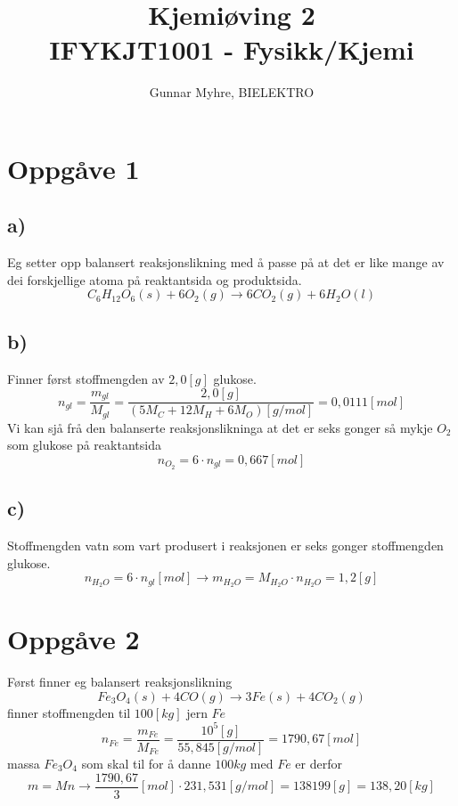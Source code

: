 \documentclass[12pt,a4paper]{article}
\title{%
  Kjemiøving 2 \\
  \large IFYKJT1001 - Fysikk/Kjemi \\
  }
\author{Gunnar Myhre, BIELEKTRO}
\begin{document}
  \maketitle

  \section*{Oppgåve 1}
    \subsection*{a)}
    Eg setter opp balansert reaksjonslikning med å passe på at det er like mange av
    dei forskjellige atoma på reaktantsida og produktsida.
    \begin{equation}
      C_6H_{12}O_6(s) + 6O_2(g) \longrightarrow 6CO_2(g) + 6H_2O(l)
    \end{equation}

    \subsection*{b)}
    Finner først stoffmengden av $2,0[g]$ glukose.
    \begin{equation}
      n_{gl} = \frac{m_{gl}}{M_{gl}} = \frac{2,0[g]}{(5M_C + 12M_H + 6M_O)[g/mol]} = 0,0111[mol]
    \end{equation}
    Vi kan sjå frå den balanserte reaksjonslikninga at det er seks gonger så mykje $O_2$ som
    glukose på reaktantsida
    \begin{equation}
      n_{O_2} = 6\cdot n_{gl} = 0,667[mol]
    \end{equation}

    \subsection*{c)}
    Stoffmengden vatn som vart produsert i reaksjonen er seks gonger stoffmengden glukose.
    \begin{equation}
      n_{H_2O} = 6\cdot n_{gl} [mol] \rightarrow m_{H_2O} = M_{H_2O}\cdot n_{H_2O} = 1,2[g]
    \end{equation}


  \section*{Oppgåve 2}
    Først finner eg balansert reaksjonslikning
    \begin{equation}
      Fe_3O_4(s) + 4CO(g) \longrightarrow 3Fe(s) + 4CO_2(g)
    \end{equation}
    finner stoffmengden til $100[kg]$ jern $Fe$
    \begin{equation}
      n_{Fe} = \frac{m_{Fe}}{M_{Fe}} = \frac{10^5[g]}{55,845[g/mol]} = 1790,67[mol]
    \end{equation}
    massa $Fe_3O_4$ som skal til for å danne $100 kg$ med $Fe$ er derfor
    \begin{equation}
      m = Mn \rightarrow
      \frac{1790,67}{3}[mol] \cdot 231,531[g/mol]
      = 138199 [g] = 138,20 [kg]
    \end{equation}
\end{document}
